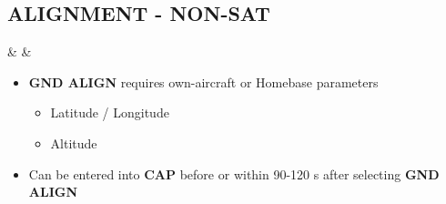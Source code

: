 \documentclass[fontInter]{TechCheck}
\begin{document}
	\subsection{ALIGNMENT - NON-SAT}
	\label{subsec:align-nonsat}
	\begin{listlongtable}
		\textbf{\textbullet} &  &
		\begin{minipage}[t]{\linewidth}
			\vspace{-7pt}
			\begin{itemize}
				\item \textbf{GND ALIGN} requires own-aircraft or Homebase parameters
				\begin{itemize}
					\item Latitude / Longitude
					\item Altitude
				\end{itemize}
				\item Can be entered into \textbf{CAP} before or within 90-120 s after selecting \textbf{GND ALIGN}
			\end{itemize}
		\end{minipage} \\
	\end{listlongtable}

\end{document}
